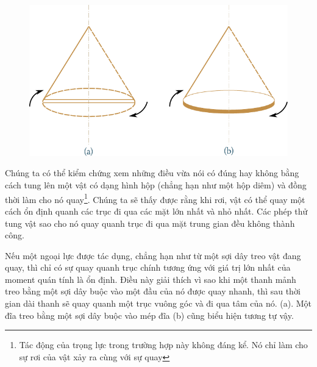 \begin{figure}[!htb]
	\begin{center}
		\includegraphics[scale=0.9]{figures/ch_05/fig_5_10.pdf}
		\caption[]{}
		\label{fig:5_10}
	\end{center}
\end{figure}

Chúng ta có thể kiểm chứng xem những điều vừa nói có đúng hay không bằng cách tung lên một vật có dạng hình hộp (chẳng hạn như một hộp diêm) và đồng thời làm cho nó quay\footnote{Tác động của trọng lực trong trường hợp này không đáng kể. Nó chỉ làm cho sự rơi của vật xảy ra cùng với sự quay}. Chúng ta sẽ thấy được rằng khi rơi, vật có thể quay một cách ổn định quanh các trục đi qua các mặt lớn nhất và nhỏ nhất. Các phép thử tung vật sao cho nó quay quanh trục đi qua mặt trung gian đều không thành công.

Nếu một ngoại lực được tác dụng, chẳng hạn như từ một sợi dây treo vật đang quay, thì chỉ có sự quay quanh trục chính tương ứng với giá trị lớn nhất của moment quán tính là ổn định. Điều này giải thích vì sao khi một thanh mảnh treo bằng một sợi dây  buộc vào một đầu của nó được quay nhanh, thì sau thời gian dài thanh sẽ quay quanh một trục vuông góc và đi qua tâm của nó. (a). Một đĩa treo bằng một sợi dây buộc vào mép đĩa (b) cũng biểu hiện tương tự vậy.

